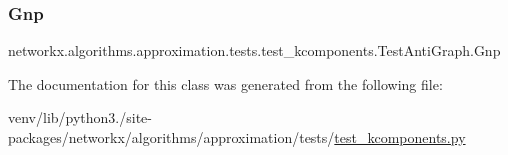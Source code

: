 \subsubsection{\texorpdfstring{Gnp}{Gnp}}
{\footnotesize\ttfamily networkx.\+algorithms.\+approximation.\+tests.\+test\+\_\+kcomponents.\+Test\+Anti\+Graph.\+Gnp}



The documentation for this class was generated from the following file\+:\begin{DoxyCompactItemize}
\item 
venv/lib/python3./site-\/packages/networkx/algorithms/approximation/tests/\hyperlink{approximation_2tests_2test__kcomponents_8py}{test\+\_\+kcomponents.\+py}\end{DoxyCompactItemize}
